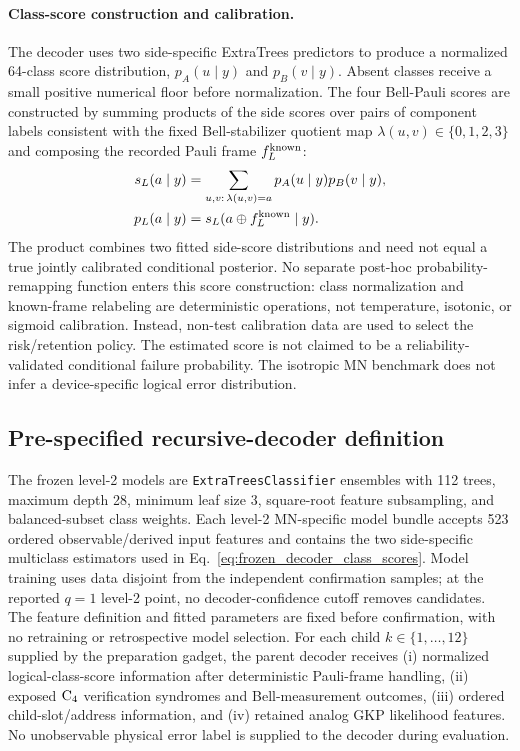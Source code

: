 \documentclass[aps,
prx,
superscriptaddress,
reprint,
longbibliography,
floatfix]{revtex4-2}
\begin{document}
\paragraph*{Class-score construction and calibration.}
The decoder uses two side-specific ExtraTrees predictors to produce a normalized 64-class score distribution, $p_A(u\mid y)$ and $p_B(v\mid y)$. Absent classes receive a small positive numerical floor before normalization. The four Bell-Pauli scores are constructed by summing products of the side scores over pairs of component labels consistent with the fixed Bell-stabilizer quotient map $\lambda(u,v)\in\{0,1,2,3\}$ and composing the recorded Pauli frame $f_L^{\rm known}$:
\begin{equation}
\begin{aligned}
 s_L(a\mid y)&=\sum_{u,v:\,\lambda(u,v)=a}p_A(u\mid y)p_B(v\mid y),\\
 p_L(a\mid y)&=s_L(a\oplus f_L^{\rm known}\mid y).
\end{aligned}
\label{eq:frozen_decoder_class_scores}
\end{equation}
The product combines two fitted side-score distributions and need not equal a true jointly calibrated conditional posterior. No separate post-hoc probability-remapping function enters this score construction: class normalization and known-frame relabeling are deterministic operations, not temperature, isotonic, or sigmoid calibration. Instead, non-test calibration data are used to select the risk/retention policy. The estimated score is not claimed to be a reliability-validated conditional failure probability. The isotropic MN benchmark does not infer a device-specific logical error distribution.
\subsection{Pre-specified recursive-decoder definition}
\label{app:frozen_recursive_decoder_contract}
The frozen level-2 models are \texttt{ExtraTreesClassifier} ensembles with 112 trees, maximum depth 28, minimum leaf size 3, square-root feature subsampling, and balanced-subset class weights. Each level-2 MN-specific model bundle accepts 523 ordered observable/derived input features and contains the two side-specific multiclass estimators used in Eq.~\eqref{eq:frozen_decoder_class_scores}. Model training uses data disjoint from the independent confirmation samples; at the reported $q=1$ level-2 point, no decoder-confidence cutoff removes candidates. The feature definition and fitted parameters are fixed before confirmation, with no retraining or retrospective model selection. For each child $k\in\{1,\ldots,12\}$ supplied by the preparation gadget, the parent decoder receives (i) normalized logical-class-score information after deterministic Pauli-frame handling, (ii) exposed ${\rm C_4}$ verification syndromes and Bell-measurement outcomes, (iii) ordered child-slot/address information, and (iv) retained analog GKP likelihood features. No unobservable physical error label is supplied to the decoder during evaluation.
\end{document}
